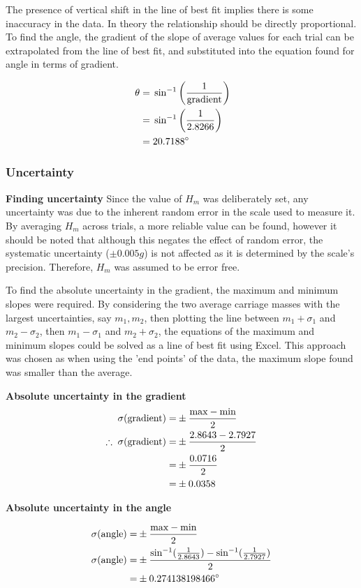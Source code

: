 \documentclass[11pt,a4paper]{article}
\begin{document}
\hfill

The presence of vertical shift in the line of best fit implies there is some inaccuracy in the data. In theory the relationship should be directly proportional.
To find the angle, the gradient of the slope of average values for each trial can be extrapolated from the line of best fit, and substituted into the equation found for angle in terms of gradient.

\begin{align*}
\centering
\;\theta=&\;\sin^{-1}\left(\frac{1}{\textrm{gradient}}\right)\\
 =& \;\sin^{-1}\left(\frac{1}{2.8266}\right)\\
	=&\;20.7188^\circ
\end{align*}

\subsubsection{Uncertainty}

{\large \textbf{Finding uncertainty}\newline}
Since the value of $H_m$ was deliberately set, any uncertainty was due to the inherent random error in the scale used to measure it. By averaging $H_m$ across trials, a more reliable value can be found, however it should be noted that although this negates the effect of random error, the systematic uncertainty ($\pm0.005g$) is not affected as it is determined by the scale's precision. Therefore, $H_m$ was assumed to be error free.

To find the absolute uncertainty in the gradient, the maximum and minimum slopes were required. By considering the two average carriage masses with the largest uncertainties, say $m_1, m_2$, then plotting the line between $m_1+\sigma_1$ and $m_2-\sigma_2$, then  $m_1-\sigma_1$ and $m_2+\sigma_2$, the equations of the maximum and minimum slopes could be solved as a line of best fit using Excel. This approach was chosen as when using the 'end points' of the data, the maximum slope found was smaller than the average.
\begin{center}
	\textbf{Absolute uncertainty in the gradient}
	\begin{align*}
		\centering
		\sigma(\textrm{gradient})=&\pm\frac{\textrm{max}-\textrm{min}}{2}\\
		\therefore\;\sigma(\textrm{gradient})=&\pm\frac{2.8643-2.7927}{2}\\
		=&\pm\frac{0.0716}{2}\\
		=&\pm0.0358
	\end{align*}
	
	\textbf{Absolute uncertainty in the angle}
	
	\begin{align*}
		\centering
		\sigma(\textrm{angle})=&\pm\frac{\textrm{max}-\textrm{min}}{2}\\
		\sigma(\textrm{angle})=&\pm\frac{\sin^{-1}(\frac{1}{2.8643})-\sin^{-1}(\frac{1}{2.7927})}{2}\\
		=&\pm0.274138198466^\circ 
	\end{align*}
	
\end{center}
\hfill
\end{document}
